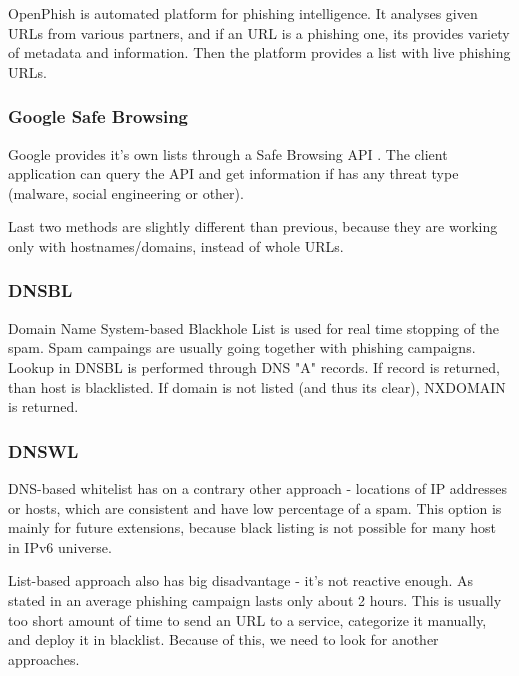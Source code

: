 \documentclass[
  digital, %
  oneside, %
  table,   %
  nolof,     %
  nolot,     %
]{fithesis3}
\begin{document}
OpenPhish \cite{openphish} is automated platform for phishing intelligence. It analyses given URLs from various partners, and if an URL is a phishing one, its provides variety of metadata and information. Then the platform provides a list with live phishing URLs. 

\subsubsection{Google Safe Browsing}
\label{section:google-safe-browsing}

Google provides it's own lists through a Safe Browsing API \cite{google-safe-browsing}. The client application can query the API and get information if has any threat type (malware, social engineering or other).

Last two methods are slightly different than previous, because they are working only with hostnames/domains, instead of whole URLs.

\subsubsection{DNSBL}

Domain Name System-based Blackhole List \cite{wiki:dnsbl} is used for real time stopping of the spam. Spam campaings are usually going together  with phishing campaigns. Lookup in DNSBL is performed through DNS "A" records. If record is returned, than host is blacklisted. If domain is not listed (and thus its clear), NXDOMAIN is returned. 

\subsubsection{DNSWL}

DNS-based whitelist \cite{wiki:dnswl} has on a contrary other approach - locations of IP addresses or hosts, which are consistent and have low percentage of a spam. This option is mainly for future extensions, because black listing is not possible for many host in IPv6 universe.

List-based approach also has big disadvantage - it's not reactive enough. As stated in \cite{empirical-analysis-blacklists} an average phishing campaign lasts only about 2 hours. This is usually too short amount of time to send an URL to a service, categorize it manually, and deploy it in blacklist. Because of this, we need to look for another approaches. 
\end{document}

